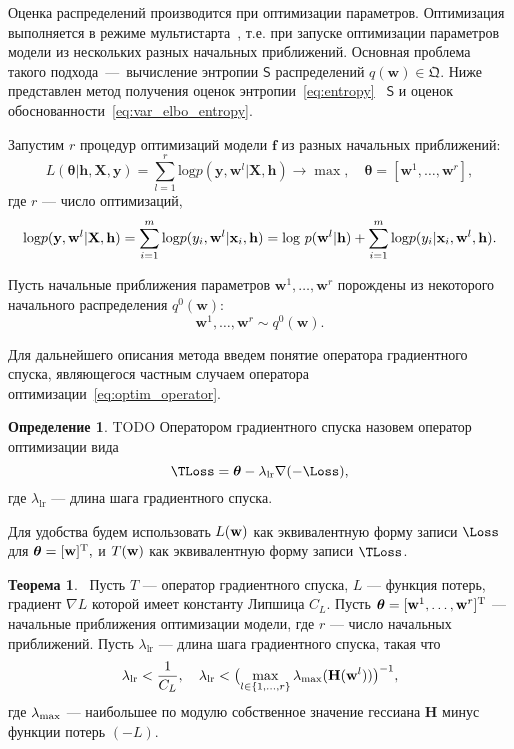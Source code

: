 \documentclass[11pt, a5paper]{dissert}
\theoremstyle{definition}
\newtheorem{theorem}{Теорема}
\newtheorem{defin}{Определение}
\begin{document}
{Оценка распределений производится при оптимизации параметров. Оптимизация выполняется в режиме мультистарта~\cite{multi}, т.е. при запуске оптимизации параметров модели из нескольких разных начальных приближений. Основная проблема такого подхода~---~вычисление энтропии $\mathsf{S}$ распределений $q(\mathbf{w}) \in \mathfrak{Q}$. Ниже представлен метод получения оценок энтропии~\eqref{eq:entropy} ~$\mathsf{S}$ и оценок обоснованности~\eqref{eq:var_elbo_entropy}.

Запустим $r$ процедур оптимизаций модели $\mathbf{f}$ из разных начальных приближений:
\[
	L( \boldsymbol{\theta}| \mathbf{h}, \mathbf{X}, \mathbf{y}) = \sum_{l=1}^r \text{log}p(\mathbf{y}, \mathbf{w}^l|\mathbf{X}, \mathbf{h})  \to \max, \quad \boldsymbol{\theta} = [\mathbf{w}^1, \dots, \mathbf{w}^r],
\] 
где $r$ --- число оптимизаций,
\begin{equation}
\label{eq:loss_func}
\text{log}p(\mathbf{y}, \mathbf{w}^l|\mathbf{X}, \mathbf{h}) = \sum_{i=1}^m \textnormal{log}p({y}_i, \mathbf{w}^l |\mathbf{x}_i, \mathbf{h}) = \textnormal{log}~p(\mathbf{w}^l|\mathbf{h}) + \sum_{i=1}^m \textnormal{log}p({y}_i |\mathbf{x}_i, \mathbf{w}^l, \mathbf{h}).
\end{equation}

Пусть начальные приближения параметров $\mathbf{w}^1, \dots, \mathbf{w}^r$ порождены из некоторого начального распределения $q^0(\mathbf{w})$:
\[ 
	\mathbf{w}^1, \dots, \mathbf{w}^r \sim q^0(\mathbf{w}). 
\]


Для дальнейшего описания метода введем понятие оператора градиентного спуска, являющегося частным случаем оператора оптимизации~\eqref{eq:optim_operator}.
\begin{defin}
TODO
Оператором градиентного спуска назовем оператор оптимизации вида
\begin{equation}
\label{eq:sgd}
	\TLoss  = \boldsymbol{\theta} - \lambda_{\text{lr}} \nabla (-\Loss), 
\end{equation}
где  $\lambda_{\text{lr}}$ --- длина шага градиентного спуска.
\end{defin}
Для удобства будем использовать $L(\mathbf{w})$ как эквивалентную форму записи $\Loss$ для $\boldsymbol{\theta} = [\mathbf{w}]^\text{T},$ и $T(\mathbf{w})$  как эквивалентную форму записи $\TLoss$. 

\begin{theorem}~Пусть $T$ --- оператор градиентного спуска,
 $L$ --- функция потерь, градиент $\nabla L$ которой имеет константу Липшица $C_L$.  Пусть $\boldsymbol{\theta} = [\mathbf{w}^1,\dots,\mathbf{w}^r]^\text{T}$ ---  начальные приближения оптимизации модели, где $r$ --- число начальных приближений. Пусть $\lambda_{\text{lr}}$ --- длина шага градиентного спуска, такая что
\begin{equation}
\label{eq:ineq}
\lambda_{\text{lr}}<\frac{1}{C_L}, \quad \lambda_{\text{lr}} < \bigl(\max_{l \in \{1,\dots,r\}}\lambda_\textnormal{max} (\mathbf{H}(\mathbf{w}^l))\bigr)^{-1}, 
\end{equation}
где $\lambda_\textnormal{max}$ --- наибольшее по модулю собственное значение гессиана  $\mathbf{H}$ минус функции потерь $(-L)$.


\end{theorem}}
\end{document}
